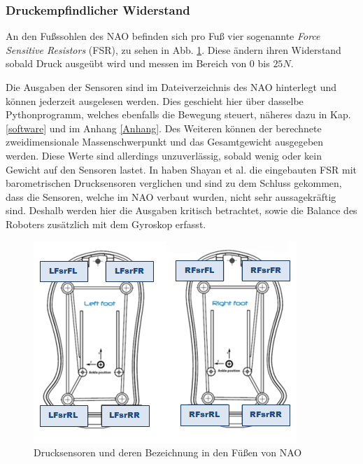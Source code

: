 \subsubsection*{Druckempfindlicher Widerstand}

An den Fußssohlen des NAO befinden sich pro Fuß vier sogenannte \textit{Force Sensitive Resistors} (FSR), zu sehen in Abb. \ref{hardware_semelles}. Diese ändern ihren Widerstand sobald Druck ausgeübt wird und messen im Bereich von 0 bis $25 \unit{N}$.

Die Ausgaben der Sensoren sind im Dateiverzeichnis des NAO hinterlegt und können jederzeit ausgelesen werden. Dies geschieht hier über dasselbe Pythonprogramm, welches ebenfalls die Bewegung steuert, näheres dazu in Kap. \ref{software} und im Anhang \ref{Anhang}.
Des Weiteren können der berechnete zweidimensionale Massenschwerpunkt und das Gesamtgewicht ausgegeben werden. Diese Werte sind allerdings unzuverlässig, sobald wenig oder kein Gewicht auf den Sensoren lastet. In \cite{pressure_shoe} haben Shayan et al. die eingebauten FSR mit barometrischen Drucksensoren verglichen und sind zu dem Schluss gekommen, dass die Sensoren, welche im NAO verbaut wurden, nicht sehr aussagekräftig sind. Deshalb werden hier die Ausgaben kritisch betrachtet, sowie die Balance des Roboters zusätzlich mit dem Gyroskop erfasst.
\begin{figure}[tb]
	\centering
	\includegraphics[width=0.6\linewidth]{Bilder/hardware_semelles.png}
	\caption{Drucksensoren und deren Bezeichnung in den Füßen von NAO \cite[ in /Technical overview/FSRs]{nao_docu_dev_guide}
	}
	\label{hardware_semelles}
\end{figure}

